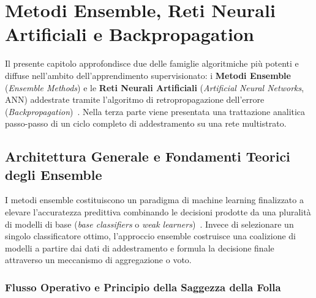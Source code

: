 \chapter{Metodi Ensemble, Reti Neurali Artificiali e Backpropagation}
\label{chap:dm-ensemble-neural-networks}

Il presente capitolo approfondisce due delle famiglie algoritmiche più potenti e diffuse nell'ambito dell'apprendimento supervisionato: i \textbf{Metodi Ensemble} (\textit{Ensemble Methods}) e le \textbf{Reti Neurali Artificiali} (\textit{Artificial Neural Networks}, ANN) addestrate tramite l'algoritmo di retropropagazione dell'errore (\textit{Backpropagation})~\cite{tan2018}. Nella terza parte viene presentata una trattazione analitica passo-passo di un ciclo completo di addestramento su una rete multistrato.

\FloatBarrier
\section{Architettura Generale e Fondamenti Teorici degli Ensemble}
\label{sec:dm-ensemble-foundations}

I metodi ensemble costituiscono un paradigma di machine learning finalizzato a elevare l'accuratezza predittiva combinando le decisioni prodotte da una pluralità di modelli di base (\textit{base classifiers} o \textit{weak learners})~\cite{tan2018}. Invece di selezionare un singolo classificatore ottimo, l'approccio ensemble costruisce una coalizione di modelli a partire dai dati di addestramento e formula la decisione finale attraverso un meccanismo di aggregazione o voto.

\FloatBarrier
\subsection{Flusso Operativo e Principio della Saggezza della Folla}
\label{subsec:dm-ensemble-workflow}

